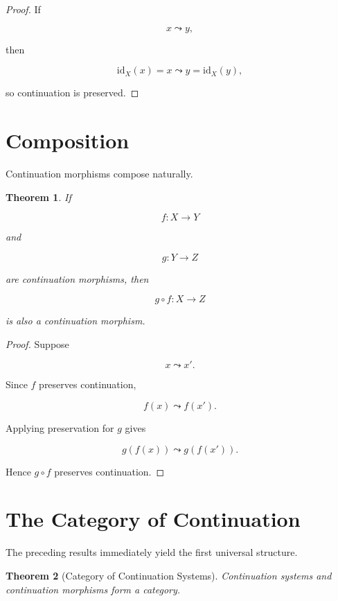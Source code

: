 \documentclass[13pt,openany]{book}
\theoremstyle{plain}
\newtheorem{theorem}{Theorem}[chapter]
\theoremstyle{definition}
\begin{document}
\begin{proof}

If

\[
x\leadsto y,
\]

then

\[
\mathrm{id}_X(x)=x
\leadsto
y=\mathrm{id}_X(y),
\]

so continuation is preserved.
\end{proof}


\section{Composition}

Continuation morphisms compose naturally.

\begin{theorem}
If

\[
f:X\to Y
\]

and

\[
g:Y\to Z
\]

are continuation morphisms, then

\[
g\circ f:X\to Z
\]

is also a continuation morphism.
\end{theorem}

\begin{proof}

Suppose

\[
x\leadsto x'.
\]

Since $f$ preserves continuation,

\[
f(x)\leadsto f(x').
\]

Applying preservation for $g$ gives

\[
g(f(x))
\leadsto
g(f(x')).
\]

Hence $g\circ f$ preserves continuation.
\end{proof}


\section{The Category of Continuation}

The preceding results immediately yield the first universal structure.

\begin{theorem}[Category of Continuation Systems]

Continuation systems and continuation morphisms form a category.

\end{theorem}
\end{document}
